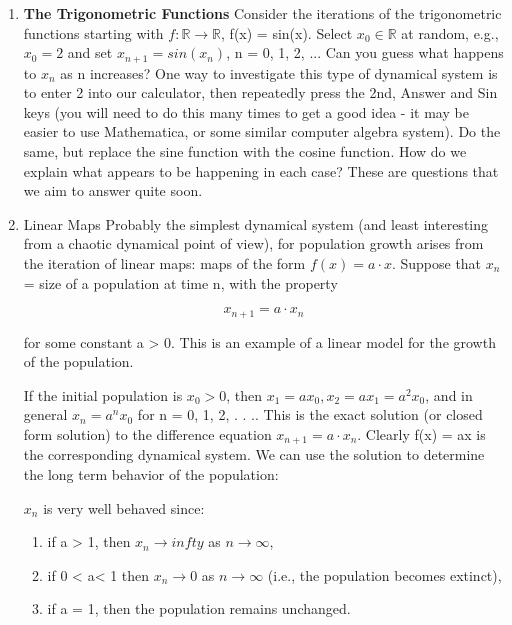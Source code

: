 \documentclass[12pt]{article}
\begin{document}
\begin{enumerate}
\item \textbf{The Trigonometric Functions} Consider the iterations of the trigonometric
functions starting with $f: \mathbb{R} \to \mathbb{R}$, f(x) = sin(x). Select $x_0 \in \mathbb{R}$ at random, e.g.,
$x_0 = 2$ and set $x_{n+1} = sin(x_n)$, n = 0, 1, 2, ... Can you guess what happens to $x_n$ as
n increases? One way to investigate this type of dynamical system is to enter 2 into
our calculator, then repeatedly press the 2nd, Answer and Sin keys (you will need
to do this many times to get a good idea - it may be easier to use Mathematica, or
some similar computer algebra system). Do the same, but replace the sine function
with the cosine function. How do we explain what appears to be happening in each
case? These are questions that we aim to answer quite soon.

\item Linear Maps Probably the simplest dynamical system (and least interesting from
a chaotic dynamical point of view), for population growth arises from the iteration of
linear maps: maps of the form $f(x) = a \cdot x$. Suppose that $x_n$ = size of a population
at time n, with the property

\[
x_{n+1} = a \cdot x_n
\]

for some constant a > 0. This is an example of a linear model for the growth of the
population.

\hfill

If the initial population is $x_0 > 0$, then $x_1 = ax_0, x_2 = ax_1 = a^2x_0$, and in general
$x_n = a^nx_0$ for n = 0, 1, 2, . . .. This is the exact solution (or closed form solution)
to the difference equation $x_{n+1} = a \cdot x_n$. Clearly f(x) = ax is the corresponding
dynamical system. We can use the solution to determine the long term behavior of
the population:

$x_n$ is very well behaved since:

\begin{enumerate}
\item  if a > 1, then $x_n \to infty$ as $n \to \infty$,

\item  if 0 < a< 1 then $x_n \to 0$ as $n \to \infty$ (i.e., the population becomes extinct),
\item if a = 1, then the population remains unchanged.
\end{enumerate}

\hfill


\end{enumerate}
\end{document}
